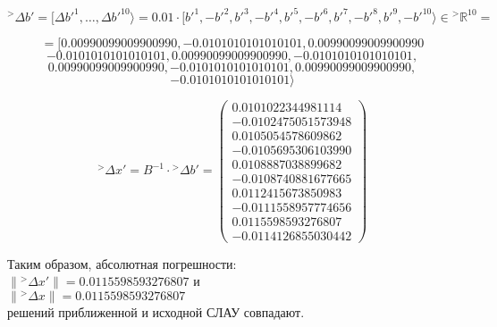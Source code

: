 \documentclass[a4paper, 12pt]{extarticle}
\begin{document}
$
    {^> \Delta b'} = 
    [ \Delta b'^1, \dots, \Delta b'^{10} \rangle = 
    0.01 \cdot [ b'^1, -b'^2, b'^3, -b'^4, b'^5, -b'^6, b'^7, -b'^8, b'^9, -b'^{10} \rangle \in {^> \mathbb{R} ^{10}} = 
$ 

\begin{equation*}
    = [ 
    0.00990099009900990,
    -0.0101010101010101,
    0.00990099009900990
\end{equation*}
\vspace{-1\baselineskip}
\begin{equation*}
    -0.0101010101010101,
    0.00990099009900990,
    -0.0101010101010101,
\end{equation*}
\vspace{-1\baselineskip}
\begin{equation*}
    0.00990099009900990,
    -0.0101010101010101,
    0.00990099009900990,
\end{equation*}
\vspace{-1\baselineskip}
\begin{equation}
    -0.0101010101010101
    \rangle
\end{equation}

\begin{equation}
    {^> \Delta x'} = B^{-1} \cdot {^> \Delta b'} = 
    \begin{pmatrix}
        0.0101022344981114 \\ 
        -0.0102475051573948 \\ 
        0.0105054578609862 \\ 
        -0.0105695306103990 \\ 
        0.0108887038899682 \\ 
        -0.0108740881677665 \\ 
        0.0112415673850983 \\ 
        -0.0111558957774656 \\ 
        0.0115598593276807 \\ 
        -0.0114126855030442 
    \end{pmatrix}
\end{equation}

\begin{spacing}{1.5}
Таким образом, абсолютная погрешности: \\
$\lVert {^> \Delta x'} \rVert = 0.0115598593276807 $ и \\ 
$\lVert {^> \Delta x} \rVert = 0.0115598593276807 $ \\ 
решений приближенной и исходной СЛАУ совпадают.
\end{spacing}
\end{document}
